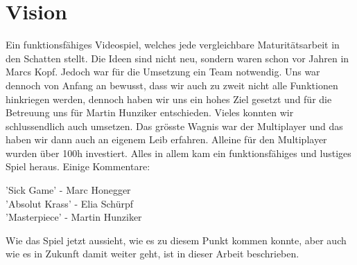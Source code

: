 \chapter{Vision}

Ein funktionsfähiges Videospiel, welches jede vergleichbare Maturitätsarbeit in den Schatten stellt.
Die Ideen sind nicht neu, sondern waren schon vor Jahren in Marcs Kopf.
Jedoch war für die Umsetzung ein Team notwendig.
Uns war dennoch von Anfang an bewusst,
dass wir auch zu zweit nicht alle Funktionen hinkriegen werden, dennoch haben wir uns ein hohes Ziel gesetzt und für die Betreuung uns für Martin Hunziker entschieden.
Vieles konnten wir schlussendlich auch umsetzen.
Das grösste Wagnis war der Multiplayer und das haben wir dann auch an eigenem Leib erfahren.
Alleine für den Multiplayer wurden über 100h investiert.
Alles in allem kam ein funktionsfähiges und lustiges Spiel heraus.
Einige Kommentare:
\begin{center}
    'Sick Game' - Marc Honegger \\
    'Absolut Krass' - Elia Schürpf \\ 
    'Masterpiece' - Martin Hunziker
\end{center}
Wie das Spiel jetzt aussieht, wie es zu diesem Punkt kommen konnte, aber auch wie es in Zukunft damit weiter geht, ist in dieser Arbeit beschrieben.